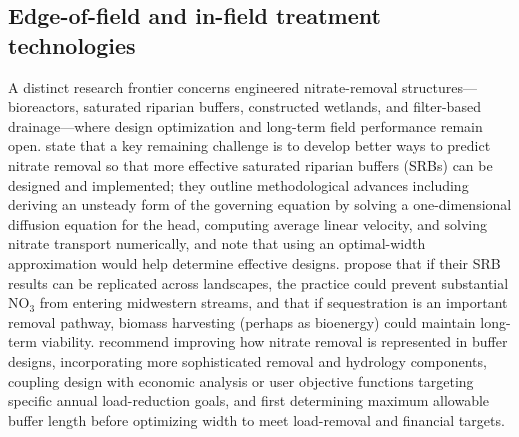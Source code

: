 \documentclass[11pt]{article}
\begin{document}
\subsection{Edge-of-field and in-field treatment technologies}
A distinct research frontier concerns engineered nitrate-removal structures---bioreactors, saturated riparian buffers, constructed wetlands, and filter-based drainage---where design optimization and long-term field performance remain open. \textcite{McEachran2020} state that a key remaining challenge is to develop better ways to predict nitrate removal so that more effective saturated riparian buffers (SRBs) can be designed and implemented; they outline methodological advances including deriving an unsteady form of the governing equation by solving a one-dimensional diffusion equation for the head, computing average linear velocity, and solving nitrate transport numerically, and note that using an optimal-width approximation would help determine effective designs. \textcite{Jaynes2014} propose that if their SRB results can be replicated across landscapes, the practice could prevent substantial NO$_3$ from entering midwestern streams, and that if sequestration is an important removal pathway, biomass harvesting (perhaps as bioenergy) could maintain long-term viability. \textcite{Abdalaal2023} recommend improving how nitrate removal is represented in buffer designs, incorporating more sophisticated removal and hydrology components, coupling design with economic analysis or user objective functions targeting specific annual load-reduction goals, and first determining maximum allowable buffer length before optimizing width to meet load-removal and financial targets.
\end{document}
